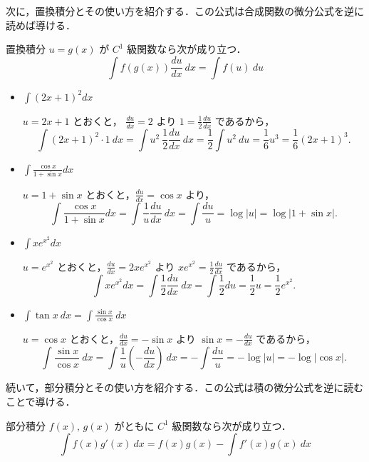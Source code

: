 \documentclass[10pt, uplatex, dvipdfmx]{jsarticle}
\theoremstyle{definition}
\numberwithin{equation}{section}
\newcommand{\ds}{\displaystyle}
\begin{document}
次に，置換積分とその使い方を紹介する．この公式は合成関数の微分公式を逆に読めば導ける．
\begin{itembox}[l]{置換積分}
$u=g(x)$ が $C^1$ 級関数なら次が成り立つ．
$$ \int f \left( g(x) \right ) \frac{du}{dx}\ dx  =\int f (u) \  du $$
\end{itembox}



\begin{itemize}
  \setlength{\itemsep}{1zh}
  
\item $\ds \int (2x+1)^2 dx$

  $u=2x+1$ とおくと， $\frac{du}{dx} = 2$ より $1 = \frac{1}{2} \frac{du}{dx}$ であるから，
  \[
    \int (2x+1)^2 \cdot 1 \ dx = \int u^2 \  \frac{1}{2} \frac{du}{dx} \  dx 
    =  \frac{1}{2} \int u^2 \ du =  \frac{1}{6} u^3  = \frac{1}{6}(2x+1)^3 .
  \]

\item $\ds \int \frac{\cos x}{1+\sin x}dx$

  $u=1+ \sin x$ とおくと，$\frac{du}{dx}=\cos x$ より， 
  \[
    \int \frac{\cos x}{1+\sin x}dx = \int \frac{1}{u} \frac{du}{dx} \ dx = 
    \int \frac{du}{u} = \log |u|  =
    \log | 1+ \sin x | .
  \]

\item $\ds \int xe^{x^2}dx$

  $u=e^{x^2}$ とおくと，$\frac{du}{dx}=2x e^{x^2}$ より $xe^{x^2} = \frac{1}{2} \frac{du}{dx}$ であるから，
  \[
    \int xe^{x^2}dx = \int \frac{1}{2} \frac{du}{dx} \ dx  = \int \frac{1}{2} du
    =\frac{1}{2}u=\frac{1}{2}e^{x^2}.
  \]

\item $\ds \int \tan x \ dx = \int \frac{\sin x}{\cos x} \ dx$

  $u=\cos x$ とおくと，$\frac{du}{dx} = -\sin x$ より $\sin x = - \frac{du}{dx}$ であるから，
  \[
    \int \frac{\sin x}{\cos x} \ dx = \int \frac{1}{u} \left(- \frac{du}{dx} \right) \ dx
    = -\int \frac{du}{u} = -\log|u|  = -\log| \cos x | .
  \]
\end{itemize}

続いて，部分積分とその使い方を紹介する．この公式は積の微分公式を逆に読むことで導ける．
\begin{itembox}[l]{部分積分}
$f(x), \, g(x)$ がともに $C^1$ 級関数なら次が成り立つ．
\[
  \int f(x) g'(x) \ dx = f(x) g(x) - \int f'(x) g(x) \ dx
\]
\end{itembox}
\end{document}
